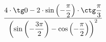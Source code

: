 \begin{ex}[type=calculate_expression]
	\begin{condition}
		\( \dfrac{4\cdot\tg0 - 2\cdot\sin\left( -\dfrac{\pi}{2} \right)\cdot\ctg\dfrac{\pi}{3}}{\left( \sin\left( -\dfrac{3\pi}{2} \right) - \cos\left( -\dfrac{\pi}{2} \right) \right)^2} \)
	\end{condition}
\end{ex}